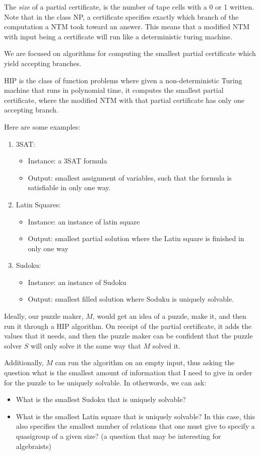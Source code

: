 \documentclass[runningheads,a4paper]{llncs}
\begin{document}
The \emph{size} of a partial certificate, is the number of tape cells with a 0 or 1 written. Note that in the class NP, a certificate specifies exactly which branch of the computation a NTM took toward an answer. This means that a modified NTM with input being a certificate will run like a deterministic turing machine. 

We are focused on algorithms for computing the smallest partial certificate which yield accepting branches. 

\begin{definition}
HIP is the class of function problems where given a non-deterministic Turing machine that runs in polynomial time, it computes the smallest partial certificate, where the modified NTM with that partial certificate has only one accepting branch.
\end{definition}

Here are some examples:
\begin{enumerate}
\item 3SAT: \begin{itemize}
	\item Instance: a 3SAT formula
	\item Output: smallest assignment of variables, such that the formula is satisfiable in only one way.
		\end{itemize}
\item Latin Squares: \begin{itemize}
				\item Instance: an instance of latin square
				\item Output: smallest partial solution where the Latin square is finished in only one way
				\end{itemize}
\item Sudoku: \begin{itemize}
				\item Instance: an instance of Sudoku
				\item Output: smallest filled solution where Soduku is uniquely solvable.
\end{itemize}
\end{enumerate}

Ideally, our puzzle maker, $M$, would get an idea of a puzzle, make it, and then run it through a HIP algorithm. On receipt of the partial certificate, it adds the values that it needs, and then the puzzle maker can be confident that the puzzle solver $S$ will only solve it the same way that $M$ solved it.

Additionally, $M$ can run the algorithm on an empty input, thus asking the question what is the smallest amount of information that I need to give in order for the puzzle to be uniquely solvable. In otherwords, we can ask:
\begin{itemize}
\item What is the smallest Sudoku that is uniquely solvable?
\item What is the smallest Latin square that is uniquely solvable? In this case, this also specifies the smallest number of relations that one must give to specify a quasigroup of a given size? (a question that may be interesting for algebraists)
\end{itemize}
\end{document}
